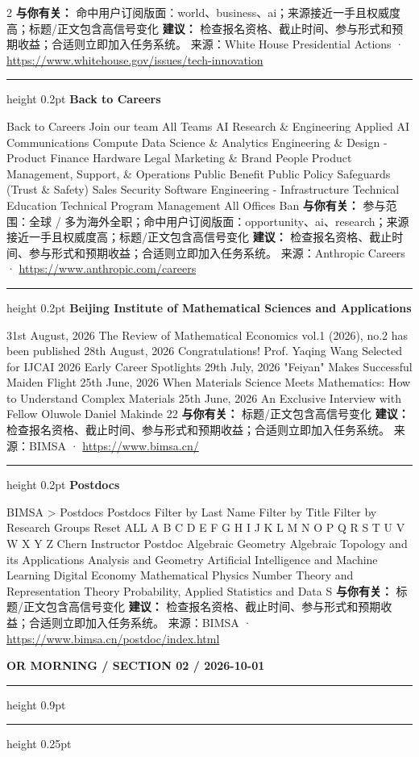 \documentclass[10.5pt]{ctexart}
\begin{document}
\begin{multicols}{2}
\textbf{与你有关：} 命中用户订阅版面：world、business、ai；来源接近一手且权威度高；标题/正文包含高信号变化
\textbf{建议：} 检查报名资格、截止时间、参与形式和预期收益；合适则立即加入任务系统。
{\footnotesize\color{ormuted} 来源：White House Presidential Actions · \url{https://www.whitehouse.gov/issues/tech-innovation}}
\vspace{2mm}
\hrule height 0.2pt
\vspace{2mm}
{\large\bfseries Back to Careers}\par
Back to Careers Join our team All Teams AI Research \& Engineering Applied AI Communications Compute Data Science \& Analytics Engineering \& Design - Product Finance Hardware Legal Marketing \& Brand People Product Management, Support, \& Operations Public Benefit Public Policy Safeguards (Trust \& Safety) Sales Security Software Engineering - Infrastructure Technical Education Technical Program Management All Offices Ban
\textbf{与你有关：} 参与范围：全球 / 多为海外全职；命中用户订阅版面：opportunity、ai、research；来源接近一手且权威度高；标题/正文包含高信号变化
\textbf{建议：} 检查报名资格、截止时间、参与形式和预期收益；合适则立即加入任务系统。
{\footnotesize\color{ormuted} 来源：Anthropic Careers · \url{https://www.anthropic.com/careers}}
\vspace{2mm}
\hrule height 0.2pt
\vspace{2mm}
{\large\bfseries Beijing Institute of Mathematical Sciences and Applications}\par
31st August, 2026 The Review of Mathematical Economics vol.1 (2026), no.2 has been published 28th August, 2026 Congratulations! Prof. Yaqing Wang Selected for IJCAI 2026 Early Career Spotlights 29th July, 2026 "Feiyan" Makes Successful Maiden Flight 25th June, 2026 When Materials Science Meets Mathematics: How to Understand Complex Materials 25th June, 2026 An Exclusive Interview with Fellow Oluwole Daniel Makinde 22
\textbf{与你有关：} 标题/正文包含高信号变化
\textbf{建议：} 检查报名资格、截止时间、参与形式和预期收益；合适则立即加入任务系统。
{\footnotesize\color{ormuted} 来源：BIMSA · \url{https://www.bimsa.cn/}}
\vspace{2mm}
\hrule height 0.2pt
\vspace{2mm}
{\large\bfseries Postdocs}\par
BIMSA > Postdocs Postdocs Filter by Last Name Filter by Title Filter by Research Groups Reset ALL A B C D E F G H I J K L M N O P Q R S T U V W X Y Z Chern Instructor Postdoc Algebraic Geometry Algebraic Topology and its Applications Analysis and Geometry Artificial Intelligence and Machine Learning Digital Economy Mathematical Physics Number Theory and Representation Theory Probability, Applied Statistics and Data S
\textbf{与你有关：} 标题/正文包含高信号变化
\textbf{建议：} 检查报名资格、截止时间、参与形式和预期收益；合适则立即加入任务系统。
{\footnotesize\color{ormuted} 来源：BIMSA · \url{https://www.bimsa.cn/postdoc/index.html}}
\end{multicols}
\newpage
{\small\bfseries OR MORNING / SECTION 02 / 2026-10-01}
\vspace{2mm}
\hrule height 0.9pt
\vspace{1.5mm}
\hrule height 0.25pt
\vspace{4mm}
\end{document}
